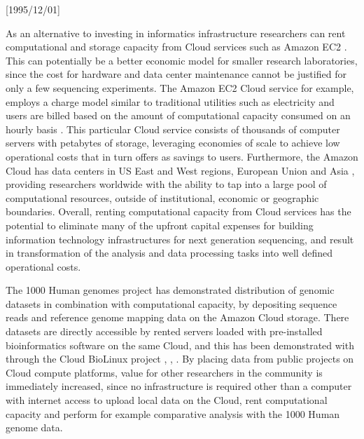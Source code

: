 \NeedsTeXFormat{LaTeX2e}[1995/12/01] \documentclass[10pt]{bmc_article}
\newenvironment{bmcformat}{\begin{raggedright}\baselineskip20pt\sloppy\setboolean{publ}{false}}{\end{raggedright}\baselineskip20pt\sloppy}
\begin{document}
\begin{bmcformat}
As an alternative to investing in informatics infrastructure researchers can rent computational 
and storage capacity from Cloud services such as Amazon EC2 \cite{awsec2}. This can potentially be
a better economic model for smaller research laboratories, since the cost for hardware and data center 
maintenance cannot be justified for only a few sequencing experiments. The Amazon EC2 Cloud service for 
example,  employs a charge model similar to traditional utilities such as electricity and users are billed based 
on the amount of computational capacity consumed on an hourly basis \cite{ec2price}. This particular Cloud 
service consists of thousands of computer servers with petabytes of storage, leveraging economies of 
scale to achieve low operational costs that in turn offers as savings to users. Furthermore, the Amazon Cloud 
has data centers in US East and West regions, European Union and Asia \cite{ec2regions}, providing researchers 
worldwide with the ability to tap into a large pool of computational resources, outside of institutional, 
economic or geographic boundaries. Overall, renting computational capacity from Cloud services has the 
potential to eliminate many of the upfront capital expenses for building information technology infrastructures 
for next generation sequencing, and result in transformation of the analysis and data processing tasks into well 
defined operational costs. 

The 1000 Human genomes project \cite{clarke2012} has demonstrated distribution of genomic datasets in combination 
with computational capacity, by depositing sequence reads and reference genome mapping data on the Amazon Cloud 
storage. There datasets are directly accessible by rented servers loaded with pre-installed bioinformatics software on the 
same Cloud, and this has been demonstrated with through the Cloud BioLinux project \cite{1000tube1}, \cite{1000tube2}, 
\cite{Krampis2012}.  By placing data from public projects on Cloud compute platforms, value for other researchers in the 
community is immediately  increased, since no infrastructure is required other than a computer with internet access to 
upload local data on the Cloud, rent computational capacity and perform for example  comparative analysis with the 1000 
Human genome data.


\end{bmcformat}
\end{document}
